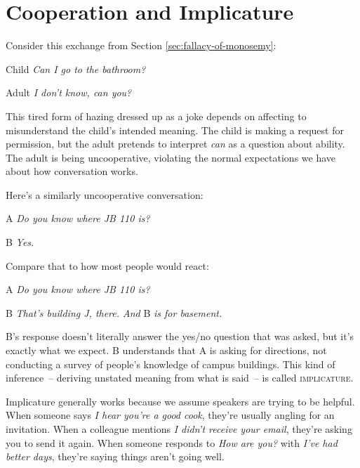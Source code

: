\section{Cooperation and Implicature}\label{sec:implicature}

Consider this exchange from Section \ref{sec:fallacy-of-monosemy}:

\begin{dialogue}
\item[Child] \textit{Can I go to the bathroom?}
\item[Adult] \textit{I don't know, can you?}
\end{dialogue}

This tired form of hazing dressed up as a joke depends on affecting to misunderstand the child's intended meaning. The child is making a request for permission, but the adult pretends to interpret \textit{can} as a question about ability. The adult is being uncooperative, violating the normal expectations we have about how conversation works.

Here's a similarly uncooperative conversation:

\begin{dialogue}
\item[A] \textit{Do you know where JB 110 is?}
\item[B] \textit{Yes.}
\end{dialogue}
Compare that to how most people would react:

\begin{dialogue}
\item[A] \textit{Do you know where JB 110 is?}
\item[B] \textit{That's building J, there. And }B\textit{ is for basement.}
\end{dialogue}

B's response doesn't literally answer the yes/no question that was asked, but it's exactly what we expect. B understands that A is asking for directions, not conducting a survey of people's knowledge of campus buildings. This kind of inference~-- deriving unstated meaning from what is said~-- is called \textsc{implicature}.

Implicature generally works because we assume speakers are trying to be helpful. When someone says \textit{I hear you're a good cook}, they're usually angling for an invitation. When a colleague mentions \textit{I didn't receive your email}, they're asking you to send it again. When someone responds to \textit{How are you?} with \textit{I've had better days}, they're saying things aren't going well.

